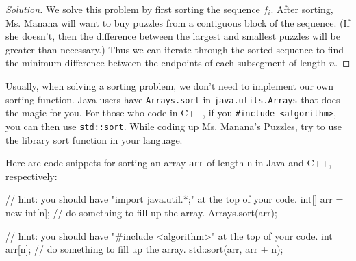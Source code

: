 \begin{proof}[Solution]
  We solve this problem by first sorting the sequence $f_i$. After sorting, Ms. Manana will want to buy puzzles from a contiguous block of the sequence. (If she doesn't, then the difference between the largest and smallest puzzles will be greater than necessary.) Thus we can iterate through the sorted sequence to find the minimum difference between the endpoints of each subsegment of length $n$.
\end{proof}

Usually, when solving a sorting problem, we don't need to implement our own sorting function. Java users have \texttt{Arrays.sort} in \texttt{java.utils.Arrays} that does the magic for you. For those who code in C++, if you \texttt{\#include <algorithm>}, you can then use \texttt{std::sort}. While coding up Ms. Manana's Puzzles, try to use the library sort function in your language.

Here are code snippets for sorting an array \texttt{arr} of length \texttt{n} in Java and C++, respectively:

\begin{mylstlisting}
// hint: you should have "import java.util.*;" at the top of your code.
int[] arr = new int[n];
// do something to fill up the array.
Arrays.sort(arr);
\end{mylstlisting}

\begin{mylstlisting}
// hint: you should have "#include <algorithm>" at the top of your code.
int arr[n];
// do something to fill up the array.
std::sort(arr, arr + n);
\end{mylstlisting}
\endgroup
